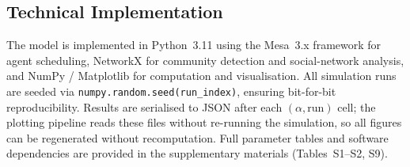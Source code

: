 \subsection{Technical Implementation}

The model is implemented in Python~3.11 using the Mesa~3.x framework for agent
scheduling, NetworkX for community detection and social-network analysis, and
NumPy / Matplotlib for computation and visualisation.
All simulation runs are seeded via \texttt{numpy.random.seed(run\_index)},
ensuring bit-for-bit reproducibility.
Results are serialised to JSON after each $(\alpha, \text{run})$ cell; the
plotting pipeline reads these files without re-running the simulation, so all
figures can be regenerated without recomputation.
Full parameter tables and software dependencies are provided in the supplementary
materials (Tables~S1--S2, S9).
